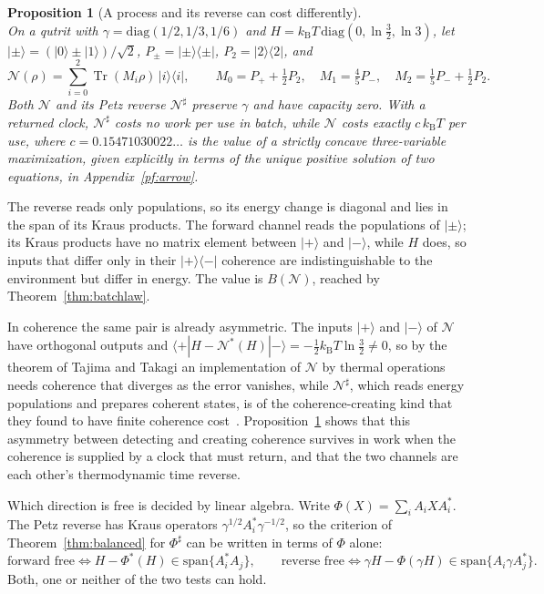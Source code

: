 \documentclass[11pt]{article}
\newtheorem{proposition}[theorem]{Proposition}
\theoremstyle{definition}
\theoremstyle{remark}
\newcommand{\Tr}{\operatorname{Tr}}
\newcommand{\kB}{k_{\mathrm B}}
\begin{document}
\begin{proposition}[A process and its reverse can cost differently]\label{prop:arrow}\leavevmode\\
On a qutrit with $\gamma=\mathrm{diag}(1/2,1/3,1/6)$ and $H=\kB T\,\mathrm{diag}(0,\ln\tfrac32,\ln3)$, let $|\pm\rangle=(|0\rangle\pm|1\rangle)/\sqrt2$, $P_\pm=|\pm\rangle\langle\pm|$, $P_2=|2\rangle\langle2|$, and
\[
\mathcal N(\rho)=\sum_{i=0}^2\Tr(M_i\rho)\,|i\rangle\langle i|,\qquad M_0=P_++\tfrac12P_2,\quad M_1=\tfrac45P_-,\quad M_2=\tfrac15P_-+\tfrac12P_2.
\]
Both $\mathcal N$ and its Petz reverse $\mathcal N^\sharp$ preserve $\gamma$ and have capacity zero. With a returned clock, $\mathcal N^\sharp$ costs no work per use in batch, while $\mathcal N$ costs exactly $c\,\kB T$ per use, where $c=0.15471030022\ldots$ is the value of a strictly concave three-variable maximization, given explicitly in terms of the unique positive solution of two equations, in Appendix~\ref{pf:arrow}.
\end{proposition}

The reverse reads only populations, so its energy change is diagonal and lies in the span of its Kraus products. The forward channel reads the populations of $|\pm\rangle$; its Kraus products have no matrix element between $|+\rangle$ and $|-\rangle$, while $H$ does, so inputs that differ only in their $|+\rangle\langle-|$ coherence are indistinguishable to the environment but differ in energy. The value is $B(\mathcal N)$, reached by Theorem~\ref{thm:batchlaw}.

In coherence the same pair is already asymmetric. The inputs $|+\rangle$ and $|-\rangle$ of $\mathcal N$ have orthogonal outputs and $\langle+|H-\mathcal N^*(H)|-\rangle=-\tfrac12\kB T\ln\tfrac32\neq0$, so by the theorem of Tajima and Takagi an implementation of $\mathcal N$ by thermal operations needs coherence that diverges as the error vanishes, while $\mathcal N^\sharp$, which reads energy populations and prepares coherent states, is of the coherence-creating kind that they found to have finite coherence cost~\cite{TajimaTakagi25}. Proposition~\ref{prop:arrow} shows that this asymmetry between detecting and creating coherence survives in work when the coherence is supplied by a clock that must return, and that the two channels are each other's thermodynamic time reverse.

Which direction is free is decided by linear algebra. Write $\Phi(X)=\sum_iA_iXA_i^*$. The Petz reverse has Kraus operators $\gamma^{1/2}A_i^*\gamma^{-1/2}$, so the criterion of Theorem~\ref{thm:balanced} for $\Phi^\sharp$ can be written in terms of $\Phi$ alone:
\[
\text{forward free}\iff H-\Phi^*(H)\in\mathrm{span}\{A_i^*A_j\},\qquad
\text{reverse free}\iff \gamma H-\Phi(\gamma H)\in\mathrm{span}\{A_i\gamma A_j^*\}.
\]
Both, one or neither of the two tests can hold.
\end{document}
